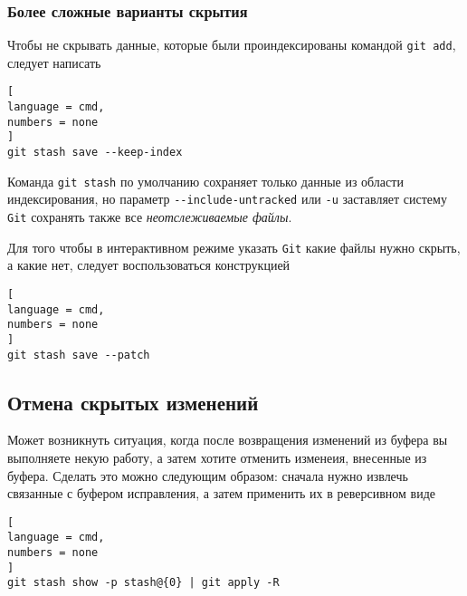 \documentclass[%
	11pt,
	a4paper,
	utf8,
		]{article}
\begin{document}
\subsubsection{Более сложные варианты скрытия}

Чтобы не скрывать данные, которые были проиндексированы командой \texttt{git add}, следует написать

\begin{lstlisting}[
language = cmd,
numbers = none
]
git stash save --keep-index
\end{lstlisting}

Команда \texttt{git stash} по умолчанию сохраняет только данные из области индексирования, но параметр \lstinline{--include-untracked} или \lstinline{-u} заставляет систему \texttt{Git} сохранять также все \emph{неотслеживаемые файлы}.

Для того чтобы в интерактивном режиме указать \texttt{Git} какие файлы нужно скрыть, а какие нет, следует воспользоваться конструкцией

\begin{lstlisting}[
language = cmd,
numbers = none
]
git stash save --patch
\end{lstlisting}


\subsection{Отмена скрытых изменений}

Может возникнуть ситуация, когда после возвращения изменений из буфера вы выполняете некую работу, а затем хотите отменить изменеия, внесенные из буфера. Сделать это можно следующим образом: сначала нужно извлечь связанные с буфером исправления, а затем применить их в реверсивном виде

\begin{lstlisting}[
language = cmd,
numbers = none
]
git stash show -p stash@{0} | git apply -R
\end{lstlisting}

\end{document}
